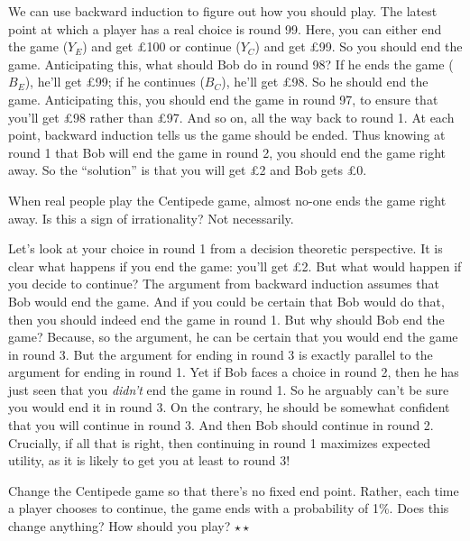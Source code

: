 We can use backward induction to figure out how you should play. The
latest point at which a player has a real choice is round 99. Here,
you can either end the game ($Y_E$) and get £100 or continue ($Y_C$)
and get £99. So you should end the game. Anticipating this, what
should Bob do in round 98? If he ends the game ($B_E$), he'll get £99;
if he continues ($B_C$), he'll get £98. So he should end the
game. Anticipating this, you should end the game in round 97, to
ensure that you'll get £98 rather than £97. And so on, all the way
back to round 1. At each point, backward induction tells us the game
should be ended. Thus knowing at round 1 that Bob will end the game in
round 2, you should end the game right away. So the ``solution'' is
that you will get £2 and Bob gets £0.

When real people play the Centipede game, almost no-one ends the game
right away. Is this a sign of irrationality? Not necessarily.

Let's look at your choice in round 1 from a decision theoretic
perspective. It is clear what happens if you end the game: you'll get
£2. But what would happen if you decide to continue? The argument from
backward induction assumes that Bob would end the game. And if you
could be certain that Bob would do that, then you should indeed end
the game in round 1. But why should Bob end the game? Because, so the
argument, he can be certain that you would end the game in round
3. But the argument for ending in round 3 is exactly parallel to the
argument for ending in round 1. Yet if Bob faces a choice in round 2,
then he has just seen that you \emph{didn't} end the game in round
1. So he arguably can't be sure you would end it in round 3. On the
contrary, he should be somewhat confident that you will continue in
round 3. And then Bob should continue in round 2. Crucially, if all
that is right, then continuing in round 1 maximizes expected utility,
as it is likely to get you at least to round 3!


\begin{exercise}
  Change the Centipede game so that there's no fixed end
  point. Rather, each time a player chooses to continue, the game ends
  with a probability of 1\%. Does this change anything? How should
  you play? $\star\star$
\end{exercise}

